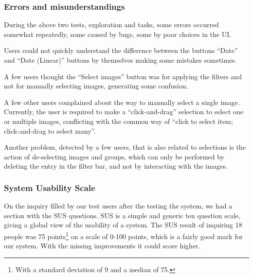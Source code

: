 {\subsubsection{Errors and misunderstandings} %

During the above two tests, exploration and tasks, some errors occurred somewhat repeatedly, some caused by bugs, some by poor choices in the \ac{UI}.

Users could not quickly understand the difference between the buttons ``Date'' and ``Date (Linear)'' buttons by themselves making some mistakes sometimes.

A few users thought the ``Select images'' button was for applying the filters and not for manually selecting images, generating some confusion.

A few other users complained about the way to manually select a single image. Currently, the user is required to make a ``click-and-drag'' selection to select one or multiple images, conflicting with the common way of ``click to select item; click-and-drag to select many''.

Another problem, detected by a few users, that is also related to selections is the action of de-selecting images and groups, which can only be performed by deleting the entry in the filter bar, and not by interacting with the images.  





\subsubsection{System Usability Scale}

On the inquiry filled by our test users after the testing the system, we had a section with the \acf{SUS} questions. \ac{SUS}\cite{Brooke:1996ua} is a simple and generic ten question scale, giving a global view of the usability of a system. The \ac{SUS} result of inquiring 18 people was 75 points\footnote{With a standard deviation of 9 and a median of 75.} on a scale of 0-100 points, which is a fairly good mark for our system. With the missing improvements it could score higher.

}
